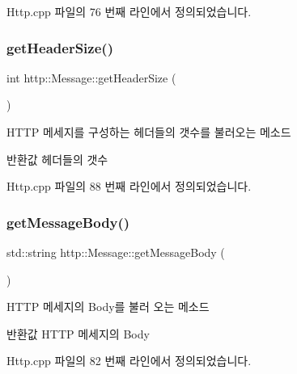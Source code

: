 Http.\+cpp 파일의 76 번째 라인에서 정의되었습니다.

\mbox{\label{classhttp_1_1_message_a5904d9972df76c1bc751d1bb352c3849}} 
\subsubsection{\texorpdfstring{get\+Header\+Size()}{getHeaderSize()}}
{\footnotesize\ttfamily int http\+::\+Message\+::get\+Header\+Size (\begin{DoxyParamCaption}{ }\end{DoxyParamCaption})}



H\+T\+TP 메세지를 구성하는 헤더들의 갯수를 불러오는 메소드 

\begin{DoxyReturn}{반환값}
헤더들의 갯수 
\end{DoxyReturn}


Http.\+cpp 파일의 88 번째 라인에서 정의되었습니다.

\mbox{\label{classhttp_1_1_message_a23c2c7bdf00670719c5493742f38eaa3}} 
\subsubsection{\texorpdfstring{get\+Message\+Body()}{getMessageBody()}}
{\footnotesize\ttfamily std\+::string http\+::\+Message\+::get\+Message\+Body (\begin{DoxyParamCaption}{ }\end{DoxyParamCaption})}



H\+T\+TP 메세지의 Body를 불러 오는 메소드 

\begin{DoxyReturn}{반환값}
H\+T\+TP 메세지의 Body 
\end{DoxyReturn}


Http.\+cpp 파일의 82 번째 라인에서 정의되었습니다.

\mbox{\label{classhttp_1_1_message_a4bc25a6f276e17cd9975ecdaa0d4093a}} 
